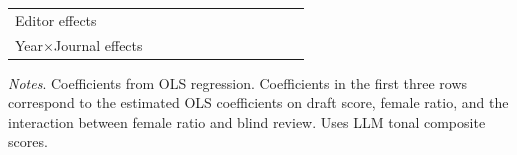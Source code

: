 \begin{table}
\begin{threeparttable}
\begin{tabular}{p{4cm}S@{}S@{}S@{}S@{}S@{}S@{}S@{}S@{}S@{}S@{}S@{}}
            \midrule
            Editor effects        &           {}   &           {}   &           {}   &           {}   &           {}   &           {}   &           {}   &           {}   &           {}   &           {}   &           {}   \\
            Year\(\times\)Journal effects          &           {}   &           {}   &           {}   &           {}   &           {}   &           {}   &           {}   &           {}   &           {}   &           {}   &           {}   \\
            \bottomrule
        \end{tabular}
        \begin{tablenotes}
            \tiny
            \item \textit{Notes}. Coefficients from OLS regression. Coefficients in the first three rows correspond to the estimated OLS coefficients on draft score, female ratio, and the interaction between female ratio and blind review. Uses LLM tonal composite scores.
        \end{tablenotes}
    \end{threeparttable}
\end{table}